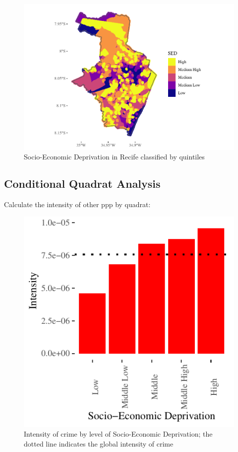 \documentclass[smallextended]{svjour3}       %
\begin{document}
\begin{figure}
\centering
\includegraphics{Moral_Communities_and_Crime_v1_files/figure-latex/plot-sed-as-quintiles-1.pdf}
\caption{\label{fig:plot-sed-as-quintiles}Socio-Economic Deprivation in
Recife classified by quintiles}
\end{figure}

\hypertarget{conditional-quadrat-analysis}{%
\subsection{Conditional Quadrat
Analysis}\label{conditional-quadrat-analysis}}

Calculate the intensity of other ppp by quadrat:

\begin{figure}
\centering
\includegraphics{Moral_Communities_and_Crime_v1_files/figure-latex/plot-crime-quadrat-1.pdf}
\caption{\label{fig:plot-crime-quadrat}Intensity of crime by level of
Socio-Economic Deprivation; the dotted line indicates the global
intensity of crime}
\end{figure}
\end{document}
